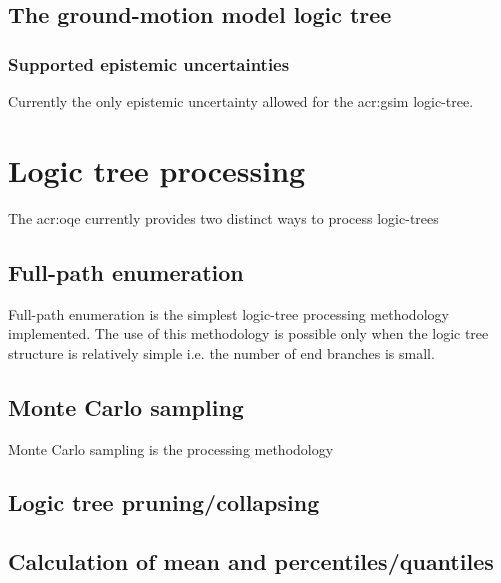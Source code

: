\subsection{The ground-motion model logic tree}
%
\subsubsection{Supported epistemic uncertainties}
Currently the only epistemic uncertainty allowed for the \gls{acr:gsim}
logic-tree.
%
\section{Logic tree processing}
The \gls{acr:oqe} currently provides two distinct ways to process logic-trees
%
\subsection{Full-path enumeration}
Full-path enumeration is the simplest logic-tree processing methodology
implemented. The use of this methodology is possible only when the logic tree
structure is relatively simple i.e. the number of end branches is small. 
%
\subsection{Monte Carlo sampling}
Monte Carlo sampling is the processing methodology 
%
\subsection{Logic tree pruning/collapsing}
\subsection{Calculation of mean and percentiles/quantiles}

